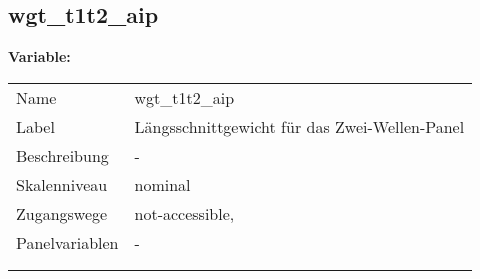 	
	
	\subsection{wgt\_t1t2\_aip}
	\label{subSection:wgt_t1t2_aip}

	\noindent\textbf{Variable:}\\
		\begin{tabular}{lL{11.3cm}}
			\label{tableVariable:wgt_t1t2_aip}
			Name & wgt\_t1t2\_aip \\
			Label & Längsschnittgewicht für das Zwei-Wellen-Panel \\
			Beschreibung & - \\
			Skalenniveau & nominal \\
			Zugangswege &
				not-accessible,
 \\
			Panelvariablen & -
			 \\
			 \\
 \\
		\end{tabular}






	
	\newpage
